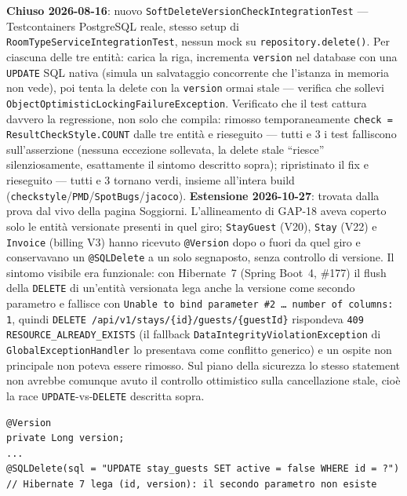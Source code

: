 ﻿\documentclass[a4paper,12pt]{report}
\begin{document}
\textbf{Chiuso 2026-08-16}: nuovo \texttt{SoftDeleteVersionCheckIntegrationTest}
--- Testcontainers PostgreSQL reale, stesso setup di
\texttt{RoomTypeServiceIntegrationTest}, nessun mock su
\texttt{repository.delete()}. Per ciascuna delle tre entità: carica la
riga, incrementa \texttt{version} nel database con una \texttt{UPDATE} SQL
nativa (simula un salvataggio concorrente che l'istanza in memoria non
vede), poi tenta la delete con la \texttt{version} ormai stale ---
verifica che sollevi \texttt{ObjectOptimisticLockingFailureException}.
Verificato che il test cattura davvero la regressione, non solo che
compila: rimosso temporaneamente \texttt{check = ResultCheckStyle.COUNT}
dalle tre entità e rieseguito --- tutti e 3 i test falliscono
sull'asserzione (nessuna eccezione sollevata, la delete stale ``riesce''
silenziosamente, esattamente il sintomo descritto sopra); ripristinato il
fix e rieseguito --- tutti e 3 tornano verdi, insieme all'intera build
(\texttt{checkstyle}/\texttt{PMD}/\texttt{SpotBugs}/\texttt{jacoco}).
\textbf{Estensione 2026-10-27}: trovata dalla prova dal vivo della pagina
Soggiorni. L'allineamento di GAP-18 aveva coperto solo le entità versionate
presenti in quel giro; \texttt{StayGuest} (V20), \texttt{Stay} (V22) e
\texttt{Invoice} (billing V3) hanno ricevuto \texttt{@Version} dopo o fuori
da quel giro e conservavano un \texttt{@SQLDelete} a un solo segnaposto,
senza controllo di versione. Il sintomo visibile era funzionale: con
Hibernate~7 (Spring Boot~4, \#177) il flush della \texttt{DELETE} di
un'entità versionata lega anche la versione come secondo parametro e
fallisce con \texttt{Unable to bind parameter \#2 \ldots{} number of
columns: 1}, quindi \texttt{DELETE /api/v1/stays/\{id\}/guests/\{guestId\}}
rispondeva \texttt{409 RESOURCE\_ALREADY\_EXISTS} (il fallback
\texttt{DataIntegrityViolationException} di \texttt{GlobalExceptionHandler}
lo presentava come conflitto generico) e un ospite non principale non
poteva essere rimosso. Sul piano della sicurezza lo stesso statement non
avrebbe comunque avuto il controllo ottimistico sulla cancellazione stale,
cioè la race \texttt{UPDATE}-vs-\texttt{DELETE} descritta sopra.

\begin{insecurebox}[title={StayGuest.java --- un solo segnaposto, nessun controllo versione (baseline)}]
\begin{lstlisting}[style=java]
@Version
private Long version;
...
@SQLDelete(sql = "UPDATE stay_guests SET active = false WHERE id = ?")
// Hibernate 7 lega (id, version): il secondo parametro non esiste
\end{lstlisting}
\end{insecurebox}
\end{document}
